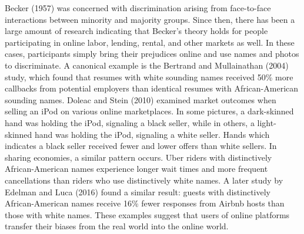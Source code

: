 Becker (1957) was concerned with discrimination arising from face-to-face interactions between minority and majority groups. Since then, there has been a large amount of research indicating that Becker's theory holds for people participating in online labor, lending, rental, and other markets as well. In these cases, participants simply bring their prejudices online and use names and photos to discriminate. A canonical example is the Bertrand and Mullainathan (2004) study, which found that resumes with white sounding names received 50\% more callbacks from potential employers than identical resumes with African-American sounding names.\cite{bertrand} Doleac and Stein (2010) examined market outcomes when selling an iPod on various online marketplaces. In some pictures, a dark-skinned hand was holding the iPod, signaling a black seller, while in others, a light-skinned hand was holding the iPod, signaling a white seller.\cite{doleac} Hands which indicates a black seller received fewer and lower offers than white sellers. In sharing economies, a similar pattern occurs. Uber riders with distinctively African-American names experience longer wait times and more frequent cancellations than riders who use distinctively white names.\cite{knittel} A later study by Edelman and Luca (2016) found a similar result: guests with distinctively African-American names receive 16\% fewer responses from Airbnb hosts than those with white names.\cite{edelman2} These examples suggest that users of online platforms transfer their biases from the real world into the online world.  

\citealp{sharing} 


